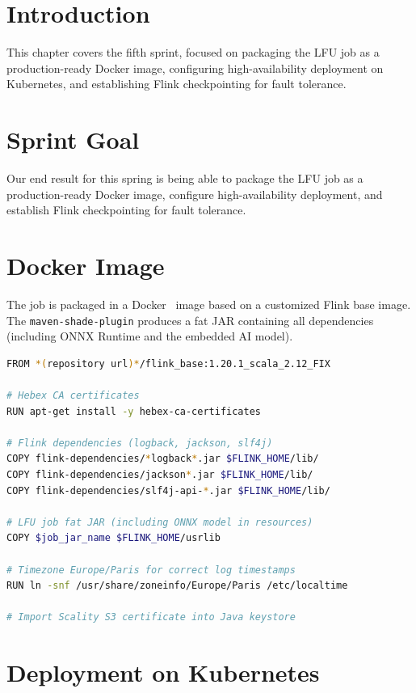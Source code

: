 

\section{Introduction}
This chapter covers the fifth sprint, focused on packaging the LFU job as a production-ready Docker image, configuring high-availability deployment on Kubernetes, and establishing Flink checkpointing for fault tolerance.


\section{Sprint Goal}

Our end result for this spring is being able to package the LFU job as a production-ready Docker image, configure high-availability deployment, and establish Flink checkpointing for fault tolerance.


\section{Docker Image}

The job is packaged in a Docker~\cite{docker} image based on a customized Flink base image. The \texttt{maven-shade-plugin} produces a fat JAR containing all dependencies (including ONNX Runtime and the embedded AI model).

\begin{lstlisting}[language=bash, caption={Dockerfile (excerpt)}]
FROM *(repository url)*/flink_base:1.20.1_scala_2.12_FIX

# Hebex CA certificates
RUN apt-get install -y hebex-ca-certificates

# Flink dependencies (logback, jackson, slf4j)
COPY flink-dependencies/*logback*.jar $FLINK_HOME/lib/
COPY flink-dependencies/jackson*.jar $FLINK_HOME/lib/
COPY flink-dependencies/slf4j-api-*.jar $FLINK_HOME/lib/

# LFU job fat JAR (including ONNX model in resources)
COPY $job_jar_name $FLINK_HOME/usrlib

# Timezone Europe/Paris for correct log timestamps
RUN ln -snf /usr/share/zoneinfo/Europe/Paris /etc/localtime

# Import Scality S3 certificate into Java keystore
\end{lstlisting}


\section{Deployment on Kubernetes}

